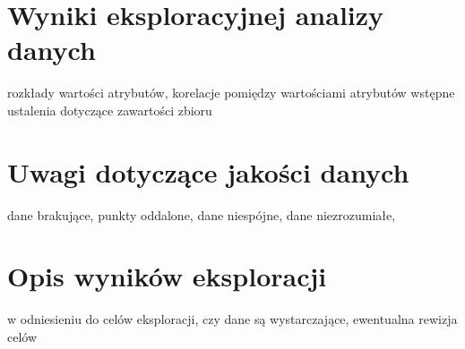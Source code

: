 \documentclass[12pt, oneside, openany]{article}
\begin{document}
\section{Wyniki eksploracyjnej analizy danych}
rozkłady wartości atrybutów, korelacje pomiędzy wartościami atrybutów
wstępne ustalenia dotyczące zawartości zbioru 
\section{Uwagi dotyczące jakości danych}
dane brakujące, punkty oddalone, dane niespójne, dane niezrozumiałe,
\section{Opis wyników eksploracji}

w odniesieniu do celów eksploracji, czy dane są wystarczające, ewentualna rewizja celów
\end{document}

